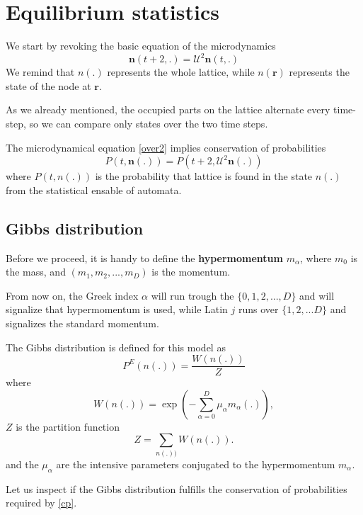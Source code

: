 \section{Equilibrium statistics}
We start by revoking the basic equation of the microdynamics
\begin{equation} \label{over2}
\bm{n}(t+2,.) = \mathcal{U}^2 \bm{n}(t,.)
\end{equation}
We remind that $n(.)$ represents the whole lattice, while $n(\bm{r})$ represents the state of the node at $\bm{r}$.

As we already mentioned, the occupied parts on the lattice alternate every time-step, so we can compare only states over the two time steps.

The microdynamical equation \ref{over2} implies conservation of probabilities
\begin{equation} \label{cp}
P(t,\bm{n}(.)) = P(t+2,\mathcal{U}^2\bm{n}(.))
\end{equation}
where $P(t,n(.))$ is the probability that lattice is found in the state $n(.)$ from the statistical ensable of automata.

\subsection{Gibbs distribution}

Before we proceed, it is handy to define the \textbf{hypermomentum} $m_{\alpha}$, where $m_{0}$ is the mass, and $(m_1,m_2,...,m_D)$ is the momentum. 

From now on, the Greek index $\alpha$ will run trough the $\{0,1,2,...,D\}$ and will signalize that hypermomentum is used, while Latin $j$ runs over $\{1,2,...D\}$ and signalizes the standard momentum.

The Gibbs distribution is defined for this model as
\begin{equation}
P^E(n(.)) = \frac{W(n(.))}{Z}
\end{equation}
where
\begin{equation}
W(n(.)) = \exp(-\sum_{\alpha = 0}^D \mu_{\alpha} m_{\alpha}(.)),
\end{equation} 
$Z$ is the partition function
\begin{equation}
Z = \sum_{n(.))} W(n(.)).
\end{equation}
and the $\mu_{\alpha}$ are the intensive parameters conjugated to the hypermomentum $m_{\alpha}$. 

Let us inspect if the Gibbs distribution fulfills the conservation of probabilities required by \ref{cp}.

